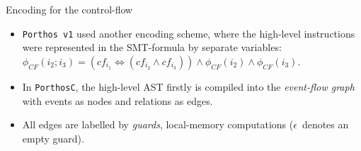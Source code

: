 \documentclass{beamer}
\begin{document}
\begin{frame}{Encoding for the control-flow}%

\begin{itemize}
\item \texttt{Porthos v1} used another encoding scheme, where the high-level instructions were represented in the SMT-formula by separate variables:
$\phi_{CF}(i_2;i_3) = (cf_{i_1} \Leftrightarrow (cf_{i_2} \land cf_{i_3})) \land \phi_{CF}(i_2) \land \phi_{CF}(i_3)$.
\item In \texttt{PorthosC}, the high-level AST firstly is compiled into the \textit{event-flow graph} with events as nodes and relations as edges.
\item All edges are labelled by \textit{guards}, local-memory computations ($\epsilon$~denotes an empty guard).
\end{itemize}


\end{frame}
\end{document}
